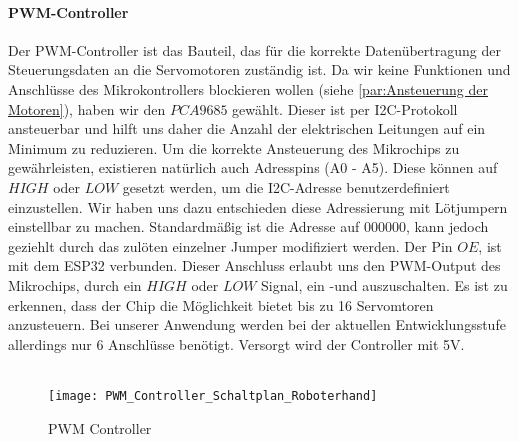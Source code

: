\documentclass[titlepage,12pt,twoside]{article}
\begin{document}
\paragraph{PWM-Controller}
\hfill \break
\hfill \break
Der PWM-Controller ist das Bauteil, das für die korrekte Datenübertragung der Steuerungsdaten an die Servomotoren zuständig ist. Da wir keine Funktionen und Anschlüsse des Mikrokontrollers blockieren wollen (siehe \autoref{par:Ansteuerung der Motoren}), 
haben wir den $PCA9685$ gewählt. Dieser ist per I2C-Protokoll ansteuerbar und hilft uns daher die Anzahl der elektrischen Leitungen auf ein Minimum zu reduzieren. Um die korrekte Ansteuerung des Mikrochips zu gewährleisten, existieren
natürlich auch Adresspins (A0 - A5). Diese können auf $HIGH$ oder $LOW$ gesetzt werden, um die I2C-Adresse benutzerdefiniert einzustellen. Wir haben uns dazu entschieden diese Adressierung mit Lötjumpern einstellbar zu machen. Standardmäßig
ist die Adresse auf $0 0 0 0 0 0$, kann jedoch geziehlt durch das zulöten einzelner Jumper modifiziert werden. Der Pin $OE$, ist mit dem ESP32 verbunden. Dieser Anschluss erlaubt uns den PWM-Output des Mikrochips, durch ein $HIGH$ oder $LOW$ 
Signal, ein -und auszuschalten. Es ist zu erkennen, dass der Chip die Möglichkeit bietet bis zu 16 Servomtoren anzusteuern. Bei unserer Anwendung werden bei der aktuellen Entwicklungsstufe allerdings nur 6 Anschlüsse benötigt. Versorgt wird
der Controller mit 5V. \\
\\
\begin{figure}[H]
	\begin{center}
		\scalebox{1.0}
		{\texttt{[image: PWM\_Controller\_Schaltplan\_Roboterhand]}}
		\caption{PWM Controller}
		\label{fig:PWM_Controller_Schaltplan_Roboterhand}		
	\end{center}
\end{figure}
\hfill \break
\end{document}

